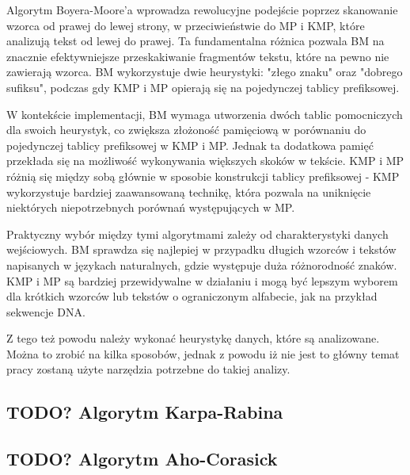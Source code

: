 Algorytm Boyera-Moore'a wprowadza rewolucyjne podejście poprzez skanowanie 
wzorca od prawej do lewej strony, w przeciwieństwie do MP i KMP, które 
analizują tekst od lewej do prawej. Ta fundamentalna różnica pozwala BM na 
znacznie efektywniejsze przeskakiwanie fragmentów tekstu, które na pewno nie 
zawierają wzorca. BM wykorzystuje dwie heurystyki: "złego znaku" oraz "dobrego
sufiksu", podczas gdy KMP i MP opierają się na pojedynczej tablicy prefiksowej.

W kontekście implementacji, BM wymaga utworzenia dwóch tablic pomocniczych dla
swoich heurystyk, co zwiększa złożoność pamięciową w porównaniu do pojedynczej 
tablicy prefiksowej w KMP i MP. Jednak ta dodatkowa pamięć przekłada się na 
możliwość wykonywania większych skoków w tekście. KMP i MP różnią się między 
sobą głównie w sposobie konstrukcji tablicy prefiksowej - KMP wykorzystuje 
bardziej zaawansowaną technikę, która pozwala na uniknięcie niektórych 
niepotrzebnych porównań występujących w MP.

Praktyczny wybór między tymi algorytmami zależy od charakterystyki danych
wejściowych. BM sprawdza się najlepiej w przypadku długich wzorców i tekstów
napisanych w językach naturalnych, gdzie występuje duża różnorodność znaków.
KMP i MP są bardziej przewidywalne w działaniu i mogą być lepszym wyborem dla 
krótkich wzorców lub tekstów o ograniczonym alfabecie, jak na przykład sekwencje
DNA.

Z tego też powodu należy wykonać heurystykę danych, które są analizowane.
Można to zrobić na kilka sposobów, jednak z powodu iż nie jest to główny temat
pracy zostaną użyte narzędzia potrzebne do takiej analizy.


\subsection{TODO? Algorytm Karpa-Rabina}
\subsection{TODO? Algorytm Aho-Corasick}